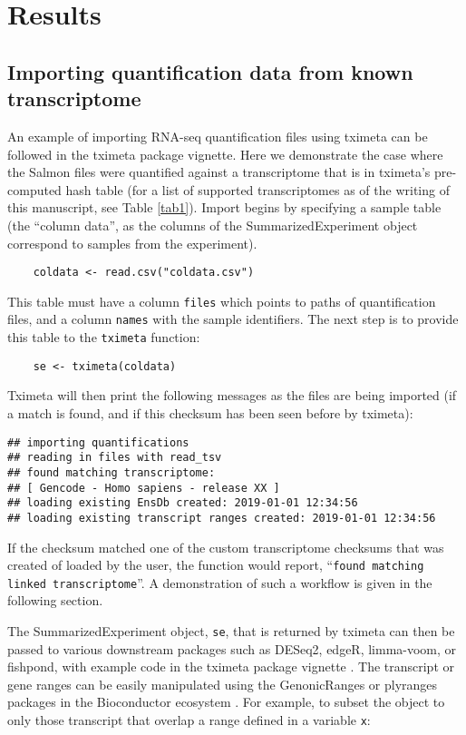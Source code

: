 \documentclass[12pt]{article}
\begin{document}
\section*{Results}

\subsection*{Importing quantification data from known transcriptome}

An example of importing RNA-seq quantification files using tximeta can be followed in the tximeta package vignette. Here we demonstrate the case where the Salmon files were quantified against a transcriptome that is in tximeta's pre-computed hash table (for a list of supported transcriptomes as of the writing of this manuscript, see Table \ref{tab1}). Import begins by specifying a sample table (the ``column data'', as the columns of the SummarizedExperiment object correspond to samples from the experiment).

\begin{verbatim}
    coldata <- read.csv("coldata.csv")
\end{verbatim}

This table must have a column \texttt{files} which points to paths of quantification files, and a column \texttt{names} with the sample identifiers. The next step is to provide this table to the \texttt{tximeta} function:

\begin{verbatim}
    se <- tximeta(coldata)
\end{verbatim}

Tximeta will then print the following messages as the files are being imported (if a match is found, and if this checksum has been seen before by tximeta):

\begin{verbatim}
## importing quantifications
## reading in files with read_tsv
## found matching transcriptome:
## [ Gencode - Homo sapiens - release XX ]
## loading existing EnsDb created: 2019-01-01 12:34:56
## loading existing transcript ranges created: 2019-01-01 12:34:56
\end{verbatim}

If the checksum matched one of the custom transcriptome checksums that was created of loaded by the user, the function would report, ``\texttt{found matching linked transcriptome}''. A demonstration of such a workflow is given in the following section.

The SummarizedExperiment object, \texttt{se}, that is returned by tximeta can then be passed to various downstream packages such as DESeq2, edgeR, limma-voom, or fishpond, with example code in the tximeta package vignette \citep{deseq2,edger,limma,voom,swish}. The transcript or gene ranges can be easily manipulated using the GenonicRanges or plyranges packages in the Bioconductor ecosystem \citep{granges,Lee2019}. For example, to subset the object to only those transcript that overlap a range defined in a variable \texttt{x}:
\end{document}
